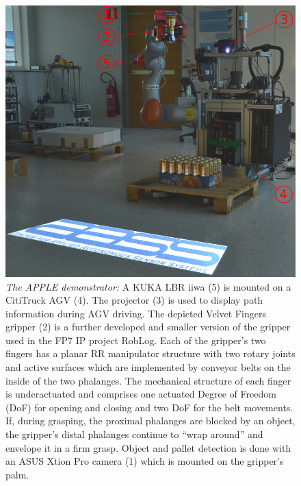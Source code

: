 \begin{figure}[t!]
\begin{center}
\includegraphics[width =1\linewidth]{figs/apple_demonstrator}
\caption{\textit{The APPLE demonstrator:} A KUKA LBR iiwa (5) is mounted on a CitiTruck AGV (4). The
  projector (3) is used to display path information during AGV driving. The depicted Velvet Fingers
  gripper (2) is a further developed and smaller version of the gripper used in the FP7 IP project
  RobLog. Each of the gripper’s two fingers has a planar RR manipulator structure with two rotary
  joints and active surfaces which are implemented by conveyor belts on the inside of the two
  phalanges. The mechanical structure of each finger is underactuated and comprises one actuated
  Degree of Freedom (DoF) for opening and closing and two DoF for the belt movements. If, during
  grasping, the proximal phalanges are blocked by an object, the gripper’s distal phalanges continue
  to “wrap around” and envelope it in a firm grasp. Object and pallet detection is done with
  an ASUS Xtion Pro camera (1) which is mounted on the gripper's palm.}
\label{fig:robot}
\end{center}
\end{figure}
%